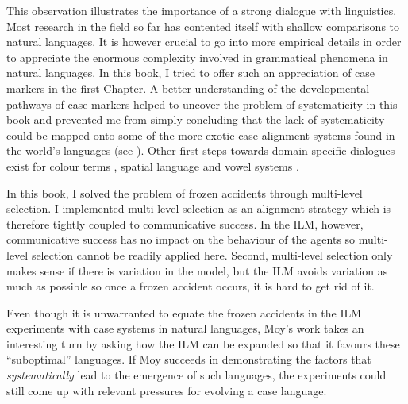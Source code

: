 This observation illustrates the importance of a strong dialogue with linguistics. Most research in the field so far has contented itself with shallow comparisons to natural languages. It is however crucial to go into more empirical details in order to appreciate the enormous complexity involved in grammatical phenomena in natural languages. In this book, I tried to offer such an appreciation of case markers in the first Chapter. A better understanding of the developmental pathways of case markers helped to uncover the problem of systematicity in this book and prevented me from simply concluding that the lack of systematicity could be mapped onto some of the more exotic case alignment systems found in the world's languages (see ). Other first steps towards domain-specific dialogues exist for colour terms \citep{steels05coordinating}, spatial language \citep{loetzsch08typological} and vowel systems \citep{deboer99self}.

In this book, I solved the problem of frozen accidents through multi-level selection. I implemented multi-level selection as an alignment strategy which is therefore tightly coupled to communicative success. In the ILM, however, communicative success has no impact on the behaviour of the agents so multi-level selection cannot be readily applied here. Second, multi-level selection only makes sense if there is variation in the model, but the ILM avoids variation as much as possible so once a frozen accident occurs, it is hard to get rid of it.

\largerpage[-1]
Even though it is unwarranted to equate the frozen accidents in the ILM experiments with case systems in natural languages, Moy's work takes an interesting turn by asking how the ILM can be expanded so that it favours these ``suboptimal'' languages. If Moy succeeds in demonstrating the factors that {\em systematically} lead to the emergence of such languages, the experiments could still come up with relevant pressures for evolving a case language.

